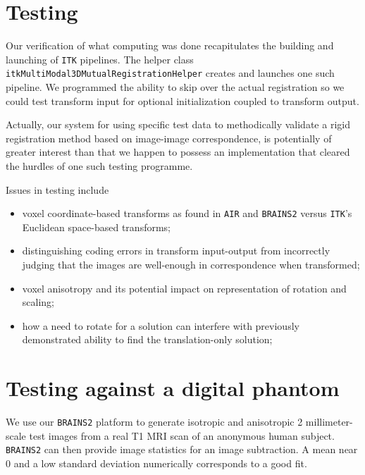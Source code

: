 \documentclass [10pt,twocolumn,twoside,final,letterpaper]{report}
\newcommand{\bcode}{\texttt}
\newcommand{\brainstwoprog}{\bcode{BRAINS2}}
\begin{document}
\section{Testing} \label{sec:testing}

Our verification of what computing was done recapitulates
the building and launching of \bcode{ITK} pipelines.
The helper class \bcode{itkMultiModal3DMutualRegistrationHelper}
creates and launches one such pipeline.
We programmed the ability to skip over the actual registration
so we could test transform input for optional initialization coupled to transform output.
\vspace{0.25in}\par
Actually, our system for using specific test data to methodically 
validate a rigid registration method based on image-image correspondence, 
is potentially of greater interest than 
that we happen to possess an implementation that 
cleared the hurdles of one such testing programme.
\vspace{0.25in}\par
Issues in testing include 
\begin{itemize}
\item voxel coordinate-based transforms as found in \bcode{AIR} \cite{web:AIR} 
and \brainstwoprog{} versus
\bcode{ITK}'s Euclidean space-based transforms; 
\item distinguishing coding errors in transform input-output from
incorrectly judging that the images are well-enough in correspondence when transformed;
\item voxel anisotropy and its potential impact on representation of rotation and scaling;
\item how a need to rotate for a solution can interfere with
previously demonstrated ability to find the translation-only solution;
\end{itemize}
\par
\section{Testing against a digital phantom} \label{sec:phantom}
We use our \brainstwoprog{} platform to generate isotropic and anisotropic
2 millimeter-scale test images from a real T1 MRI scan of an anonymous human subject.
\brainstwoprog{} can then provide image statistics for an image subtraction.
A mean near 0 and a low standard deviation numerically corresponds to a good fit.
\end{document}
